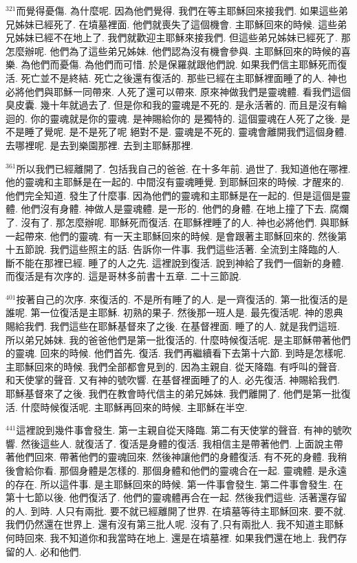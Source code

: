 \documentclass{book}
\begin{document}
$^{321}$而覺得憂傷.
為什麼呢.
因為他們覺得.
我們在等主耶穌回來接我們.
如果這些弟兄姊妹已經死了.
在墳墓裡面.
他們就喪失了這個機會.
主耶穌回來的時候.
這些弟兄姊妹已經不在地上了.
我們就歡迎主耶穌來接我們.
但這些弟兄姊妹已經死了.
那怎麼辦呢.
他們為了這些弟兄姊妹.
他們認為沒有機會參與.
主耶穌回來的時候的喜樂.
為他們而憂傷.
為他們而可惜.
於是保羅就跟他們說.
如果我們信主耶穌死而復活.
死亡並不是終結.
死亡之後還有復活的.
那些已經在主耶穌裡面睡了的人.
神也必將他們與耶穌一同帶來.
人死了還可以帶來.
原來神做我們是靈魂體.
看我們這個臭皮囊.
幾十年就過去了.
但是你和我的靈魂是不死的.
是永活著的.
而且是沒有輪迴的.
你的靈魂就是你的靈魂.
是神賜給你的 是獨特的.
這個靈魂在人死了之後.
是不是睡了覺呢.
是不是死了呢 絕對不是.
靈魂是不死的.
靈魂會離開我們這個身體.
去哪裡呢.
是去到樂園那裡.
去到主耶穌那裡.

$^{361}$所以我們已經離開了.
包括我自己的爸爸.
在十多年前.
過世了.
我知道他在哪裡.
他的靈魂和主耶穌是在一起的.
中間沒有靈魂睡覺.
到耶穌回來的時候.
才醒來的.
他們完全知道.
發生了什麼事.
因為他們的靈魂和主耶穌是在一起的.
但是這個是靈體.
他們沒有身體.
神做人是靈魂體.
是一形的.
他們的身體.
在地上撞了下去.
腐爛了.
沒有了.
那怎麼辦呢.
耶穌死而復活.
在耶穌裡睡了的人.
神也必將他們.
與耶穌一起帶來.
他們的靈魂.
有一天主耶穌回來的時候.
是會跟著主耶穌回來的.
然後第十五節說.
我們這些照主的話.
告訴你一件事.
我們這些活著.
全流到主降臨的人.
斷不能在那裡已經.
睡了的人之先.
這裡說到復活.
說到神給了我們一個新的身體.
而復活是有次序的.
這是哥林多前書十五章.
二十三節說.

$^{401}$按著自己的次序.
來復活的.
不是所有睡了的人.
是一齊復活的.
第一批復活的是誰呢.
第一位復活是主耶穌.
初熟的果子.
然後那一班人是.
最先復活呢.
神的恩典賜給我們.
我們這些在耶穌基督來了之後.
在基督裡面.
睡了的人.
就是我們這班.
所以弟兄姊妹.
我的爸爸他們是第一批復活的.
什麼時候復活呢.
是主耶穌帶著他們的靈魂.
回來的時候.
他們首先.
復活.
我們再繼續看下去第十六節.
到時是怎樣呢.
主耶穌回來的時候.
我們全部都會見到的.
因為主親自.
從天降臨.
有呼叫的聲音.
和天使掌的聲音.
又有神的號吹響.
在基督裡面睡了的人.
必先復活.
神賜給我們.
耶穌基督來了之後.
我們在教會時代信主的弟兄姊妹.
我們離開了.
他們是第一批復活.
什麼時候復活呢.
主耶穌再回來的時候.
主耶穌在半空.

$^{441}$這裡說到幾件事會發生.
第一主親自從天降臨.
第二有天使掌的聲音.
有神的號吹響.
然後這些人.
就復活了.
復活是身體的復活.
我相信主是帶著他們.
上面說主帶著他們回來.
帶著他們的靈魂回來.
然後神讓他們的身體復活.
有不死的身體.
我稍後會給你看.
那個身體是怎樣的.
那個身體和他們的靈魂合在一起.
靈魂體.
是永遠的存在.
所以這件事.
是主耶穌回來的時候.
第一件事會發生.
第二件事會發生.
在第十七節以後.
他們復活了.
他們的靈魂體再合在一起.
然後我們這些.
活著還存留的人.
到時.
人只有兩批.
要不就已經離開了世界.
在墳墓等待主耶穌回來.
要不就.
我們仍然還在世界上.
還有沒有第三批人呢.
沒有了,只有兩批人.
我不知道主耶穌何時回來.
我不知道你和我當時在地上.
還是在墳墓裡.
如果我們還在地上.
我們存留的人.
必和他們.
\end{document}
